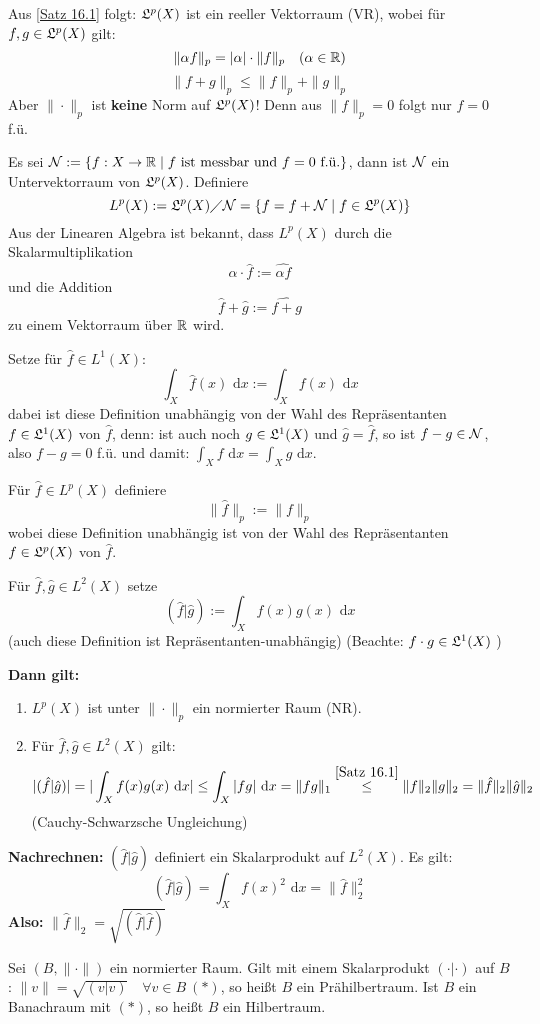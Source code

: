 \documentclass[a4paper,twoside,DIV15,BCOR12mm,chapterprefix=true,headings=onelinechapter]{scrbook}
\begin{document}
Aus \ref{Satz 16.1} folgt: $\mathfrak{L}^p(X)$ ist ein reeller Vektorraum (VR), wobei für $f,g\in\mathfrak{L}^p(X)$ gilt:
\[\|\alpha f\|_p=|\alpha|\cdot \|f\|_p\quad (\alpha\in\mathbb{R})\]
\[\|f+g\|_p\le\|f\|_p+\|g\|_p\]
Aber $\|\cdot\|_p$ ist \textbf{keine} Norm auf $\mathfrak{L}^p(X)$! Denn aus $\|f\|_p=0$ folgt nur $f=0$ f.ü.

\begin{definition}
Es sei $\mathcal{N}:=\{f:X\to\mathbb{R}\mid f\text{ ist messbar und } f=0 \text{ f.ü.}\}$, dann ist $\mathcal{N}$ ein Untervektorraum von $\mathfrak{L}^p(X)$. Definiere
\[L^p(X):=\mathfrak{L}^p(X)\diagup\mathcal{N}=\{f=f+\mathcal{N}\mid f\in\mathfrak{L}^p(X)\}\]
Aus der Linearen Algebra ist bekannt, dass $L^p(X)$ durch die Skalarmultiplikation
\[\alpha\cdot\hat f := \widehat{\alpha f}\]
und die Addition
\[\hat f+\hat g:=\widehat{f+g}\]
zu einem Vektorraum über $\mathbb{R}$ wird.
\end{definition}

Setze f\"ur $\hat f \in L^1(X)$: 
\[\int_X \hat f(x) \text{ d}x := \int_X f(x) \text{ d}x\]
dabei ist diese Definition unabh\"angig von der Wahl des Repr\"asentanten $f \in \mathfrak{L}^1(X)$ von $\hat f$, denn: ist auch noch $g \in \mathfrak{L}^1(X)$ und $\hat g = \hat f$, so ist $f - g \in \mathcal{N}$, also $f-g = 0$ f.\"u. und damit: $\int_X f \text{ d}x = \int_X g \text{ d}x$.

F\"ur $\hat f \in L^p(X)$ definiere 
\[\| \hat f \|_p := \| f \|_p\]
wobei diese Definition unabh\"angig ist von der Wahl des Repr\"asentanten $f \in \mathfrak{L}^p(X)$ von $\hat f$.

F\"ur $\hat f, \hat g \in L^2(X)$ setze 
\[( \hat f | \hat g ) := \int_X f(x)g(x) \text{ d}x\]
(auch diese Definition ist Repr\"asentanten-unabh\"angig) (Beachte: $f\cdot g \in \mathfrak{L}^1(X)$ )

\textbf{Dann gilt:} \begin{enumerate} \item $L^p(X)$ ist unter $\| \cdot \|_p$ ein normierter Raum (NR).
\item F\"ur $\hat f, \hat g \in L^2(X)$ gilt:
\[ | ( \hat f | \hat g ) | = | \int_X f(x)g(x) \text{ d}x | \leq \int_X |fg| \text{ d}x = \| fg \|_1 \overset{\ref{Satz 16.1}}{\leq} \| f \|_2 \| g \|_2 = \| \hat f \|_2 \| \hat g \|_2 \]
(Cauchy-Schwarzsche Ungleichung)
\end{enumerate}
\textbf{Nachrechnen:} $( \hat f | \hat g )$ definiert ein Skalarprodukt auf $L^2(X)$. Es gilt:
\[ ( \hat f | \hat g) = \int_X f(x)^2 \text{ d}x = \| \hat f \|_2^2 \]
\textbf{Also:} $\| \hat f \|_2 = \sqrt{( \hat f | \hat f )}$

\begin{definition}
Sei $(B, \| \cdot \|)$ ein normierter Raum. Gilt mit einem Skalarprodukt $( \cdot | \cdot )$ auf $B$: $ \| v \| = \sqrt{(v | v)} \quad \forall v \in B\ (*)$, so hei\ss t $B$ ein Pr\"ahilbertraum. Ist $B$ ein Banachraum mit $(*)$, so hei\ss t $B$ ein Hilbertraum.
\end{definition}
\end{document}
